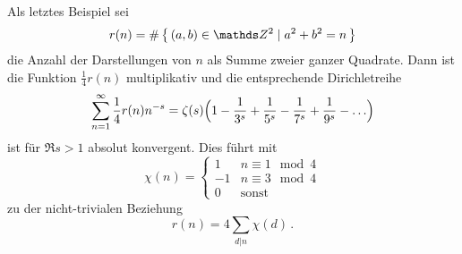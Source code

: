 Als letztes Beispiel sei
\[
r(n) = \# \Set{ (a,b) \in \ZZ^2 \mid a^2 + b^2 = n}
\]
die Anzahl der Darstellungen von $n$ als Summe zweier ganzer Quadrate.
Dann ist die Funktion $\frac{1}{4}r(n)$ multiplikativ und die entsprechende Dirichletreihe
\[
\sum_{n=1}^\infty \frac{1}{4} r(n) n^{-s}
= \zeta(s) \Bigl( 1 - \frac{1}{3^s} + \frac{1}{5^s} - \frac{1}{7^s} + \frac{1}{9^s} - \ldots \Bigr)
\]
ist für $\Re s > 1$ absolut konvergent. Dies führt mit 
\[
\chi(n)
= \begin{cases}
1 & n \equiv 1 \mod 4 \\
-1 & n \equiv 3 \mod 4 \\
0 & \text{sonst}
\end{cases}
\]
zu der nicht-trivialen Beziehung
\[
r(n) = 4\sum_{d|n} \chi(d)
\,.
\]